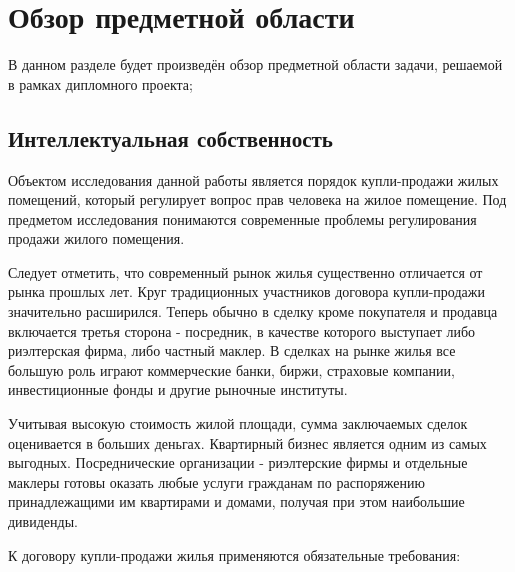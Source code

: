 
\section{Обзор предметной области} %
\label{sec:domain}

В данном разделе будет произведён обзор предметной области задачи, решаемой в рамках дипломного проекта;

\subsection{Интеллектуальная собственность}
\label{sub:domain:ip}
Объектом исследования данной работы является порядок купли-продажи жилых помещений, который регулирует вопрос прав человека на жилое помещение. Под предметом исследования понимаются современные проблемы регулирования продажи жилого помещения.

Следует отметить, что современный рынок жилья существенно отличается от рынка прошлых лет. Круг традиционных участников договора купли-продажи значительно расширился. Теперь обычно в сделку кроме покупателя и продавца включается третья сторона - посредник, в качестве которого выступает либо риэлтерская фирма, либо частный маклер. В сделках на рынке жилья все большую роль играют коммерческие банки, биржи, страховые компании, инвестиционные фонды и другие рыночные институты.

Учитывая высокую стоимость жилой площади, сумма заключаемых сделок оценивается в больших деньгах. Квартирный бизнес является одним из самых выгодных. Посреднические организации - риэлтерские фирмы и отдельные маклеры готовы оказать любые услуги гражданам по распоряжению принадлежащими им квартирами и домами, получая при этом наибольшие дивиденды.

К договору купли-продажи жилья применяются обязательные требования:

